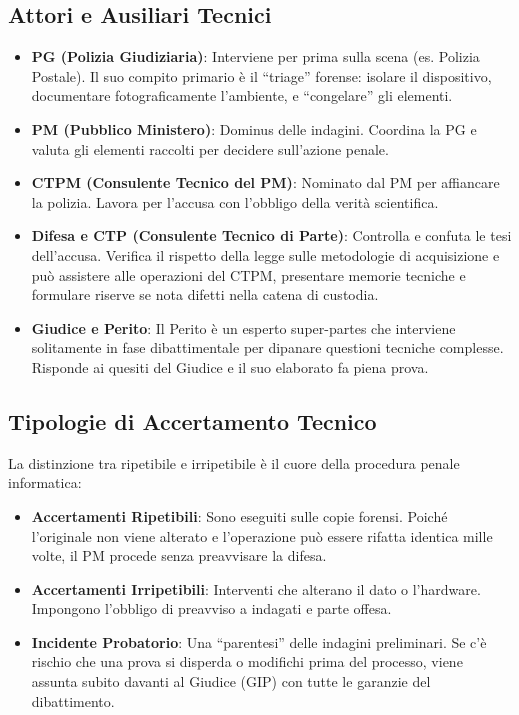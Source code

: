 \documentclass[11pt,a4paper]{article}
\begin{document}
\subsection{Attori e Ausiliari Tecnici}
\begin{itemize}
    \item \textbf{PG (Polizia Giudiziaria)}: Interviene per prima sulla scena (es. Polizia Postale). Il suo compito primario è il ``triage'' forense: isolare il dispositivo, documentare fotograficamente l'ambiente, e ``congelare'' gli elementi. 
    \item \textbf{PM (Pubblico Ministero)}: Dominus delle indagini. Coordina la PG e valuta gli elementi raccolti per decidere sull'azione penale.
    \item \textbf{CTPM (Consulente Tecnico del PM)}: Nominato dal PM per affiancare la polizia. Lavora per l'accusa con l'obbligo della verità scientifica.
    \item \textbf{Difesa e CTP (Consulente Tecnico di Parte)}: Controlla e confuta le tesi dell'accusa. Verifica il rispetto della legge sulle metodologie di acquisizione e può assistere alle operazioni del CTPM, presentare memorie tecniche e formulare riserve se nota difetti nella catena di custodia.
    \item \textbf{Giudice e Perito}: Il Perito è un esperto super-partes che interviene solitamente in fase dibattimentale per dipanare questioni tecniche complesse. Risponde ai quesiti del Giudice e il suo elaborato fa piena prova.
\end{itemize}

\subsection{Tipologie di Accertamento Tecnico}
La distinzione tra ripetibile e irripetibile è il cuore della procedura penale informatica:
\begin{itemize}
    \item \textbf{Accertamenti Ripetibili}: Sono eseguiti sulle copie forensi. Poiché l'originale non viene alterato e l'operazione può essere rifatta identica mille volte, il PM procede senza preavvisare la difesa.
    \item \textbf{Accertamenti Irripetibili}: Interventi che alterano il dato o l'hardware. Impongono l'obbligo di preavviso a indagati e parte offesa.
    \item \textbf{Incidente Probatorio}: Una ``parentesi'' delle indagini preliminari. Se c'è rischio che una prova si disperda o modifichi prima del processo, viene assunta subito davanti al Giudice (GIP) con tutte le garanzie del dibattimento.
\end{itemize}
\end{document}
